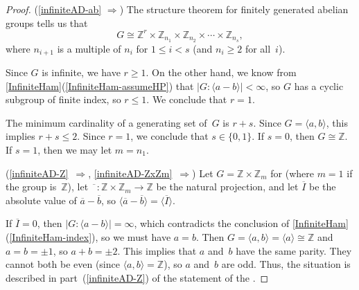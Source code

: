 \documentclass[11pt]{amsart}
\newcommand{\fullcref}[2]{\cref{#1}(\ref{#1-#2})}
\theoremstyle{definition}
\numberwithin{case}{startcases}
\numberwithin{equation}{section}
\newcommand{\Z}{\mathbb{Z}}  %
\begin{document}
\begin{proof}
		\medbreak
		
		(\ref{infiniteAD-ab} $\Rightarrow$) The structure theorem for finitely generated abelian groups \cite[4.2.10]{robinson2012course} tells us that 
		\[ G \cong \Z^r \times \Z_{n_1} \times \Z_{n_2} \times \cdots \times \Z_{n_s}, \]
		where $n_{i+1}$ is a multiple of $n_i$ for $1 \le i < s$ (and $n_i \ge 2$ for all~$i$).
		
		Since $G$ is infinite, we have $r \ge 1$. On the other hand, we know from \fullcref{InfiniteHam}{assumeHP} that $|G : \langle a - b \rangle| < \infty$, so $G$ has a cyclic subgroup of finite index, so $r \le 1$. We conclude that $r = 1$.
		
		The minimum cardinality of a generating set of~$G$ is $r + s$. Since $G = \langle a , b \rangle$, this implies $r + s \le 2$. Since $r = 1$, we conclude that $s \in \{0,1\}$. If $s = 0$, then $G \cong \Z$. If $s = 1$, then we may let $m = n_1$.
		
		\medbreak
		
		(\ref{infiniteAD-Z}~$\Rightarrow$, \ref{infiniteAD-ZxZm}~$\Rightarrow$)
		Let $G = \Z \times \Z_m$ for (where $m = 1$ if the group is~$\Z$), let $\overline{\phantom{x}} \colon \Z \times \Z_m \to \Z$ be the natural projection, and let $\overline I$ be the absolute value of $\overline a - \overline b$, so $\langle \overline{a} - \overline{b} \rangle = \langle \overline I \rangle$.
		
		If $\overline I = 0$, then $|G : \langle a - b \rangle| = \infty$, which contradicts the conclusion of \fullcref{InfiniteHam}{index}, so we must have $a = b$. Then $G = \langle a, b \rangle = \langle a \rangle \cong \Z$ and $a = b = \pm 1$, so $a + b = \pm 2$. This implies that $a$ and~$b$ have the same parity. They cannot both be even (since $\langle a, b \rangle = \Z$), so $a$ and~$b$ are odd. Thus, the situation is described in part~(\ref{infiniteAD-Z}) of the statement of the .
		

\end{proof}
\end{document}
